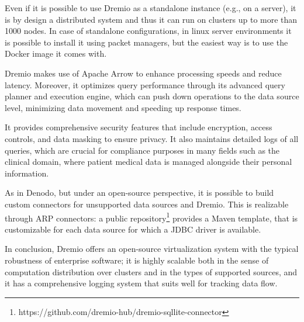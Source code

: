 Even if it is possible to use Dremio as a standalone instance (e.g., on a server), it is by design a distributed system and thus it can run on clusters up to more than 1000 nodes. In case of standalone configurations, in linux server environments it is possible to install it using packet managers, but the easiest way is to use the Docker image it comes with.

Dremio makes use of Apache Arrow to enhance processing speeds and reduce latency. Moreover, it optimizes query performance through its advanced query planner and execution engine, which can push down operations to the data source level, minimizing data movement and speeding up response times.

It provides comprehensive security features that include encryption, access controls, and data masking to ensure privacy. It also maintains detailed logs of all queries, which are crucial for compliance purposes in many fields such as the clinical domain, where patient medical data is managed alongside their personal information.

As in Denodo, but under an open-source perspective, it is possible to build custom connectors for unsupported data sources and Dremio. This is realizable through \ac{ARP} connectors: a public repository\footnote{https://github.com/dremio-hub/dremio-sqllite-connector} provides a Maven template, that is customizable for each data source for which a \ac{JDBC} driver is available.

In conclusion, Dremio offers an open-source virtualization system with the typical robustness of enterprise software; it is highly scalable both in the sense of computation distribution over clusters and in the types of supported sources, and it has a comprehensive logging system that suits well for tracking data flow.

